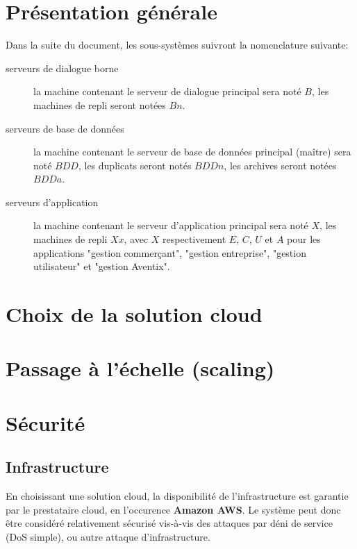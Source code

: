 




\section{Présentation générale}

Dans la suite du document, les sous-systèmes suivront la nomenclature suivante:

\begin{description}
    \item[serveurs de dialogue borne] la machine contenant le serveur de
        dialogue principal sera noté $B$, les machines de repli seront notées
        $Bn$.
    \item[serveurs de base de données] la machine contenant le serveur de base
        de données principal (maître) sera noté $BDD$, les duplicats seront
        notés $BDDn$, les archives seront notées $BDDa$.
    \item[serveurs d'application] la machine contenant le serveur d'application
        principal sera noté $X$, les machines de repli $Xx$, avec $X$
        respectivement $E$, $C$, $U$ et $A$ pour les applications "gestion
        commerçant", "gestion entreprise", "gestion utilisateur" et "gestion
        Aventix".
\end{description}

\section{Choix de la solution cloud}
\section{Passage à l'échelle (scaling)}

\section{Sécurité}

\subsection{Infrastructure}

En choisissant une solution cloud, la disponibilité de l'infrastructure est
garantie par le prestataire cloud, en l'occurence \textbf{Amazon AWS}. Le
système peut donc être considéré relativement sécurisé vis-à-vis des attaques
par déni de service (DoS simple), ou autre attaque d'infrastructure. \\

